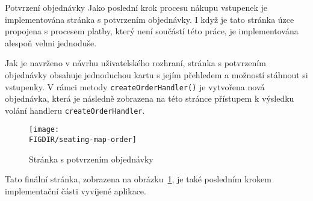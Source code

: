 \begin{subsection}{Potvrzení objednávky}
    \label{subsec:implementace-checkout-order-confirmation}
    Jako poslední krok procesu nákupu vstupenek je implementována stránka s potvrzením objednávky.
    I když je tato stránka úzce propojena s procesem platby, který není součástí této práce, je implementována alespoň velmi jednoduše.

    Jak je navrženo v návrhu uživatelského rozhraní, stránka s potvrzením objednávky obsahuje jednoduchou kartu s jejím přehledem a možností stáhnout si vstupenky.
    V rámci metody \texttt{createOrderHandler()} je vytvořena nová objednávka, která je následně zobrazena na této stránce přístupem k výsledku volání handleru \texttt{createOrderHandler}.

    \begin{figure}[H]
        \centering
        \caption{Stránka s potvrzením objednávky}
        \texttt{[image: \\FIGDIR/seating-map-order]}
        \source{}
        \label{fig:seating-map-order}
    \end{figure}

    Tato finální stránka, zobrazena na obrázku~\ref{fig:seating-map-order}, je také posledním krokem implementační části vyvíjené aplikace.
\end{subsection}
